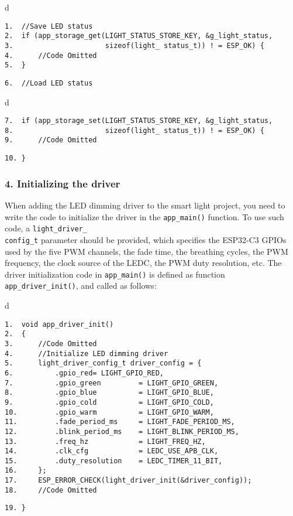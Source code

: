 \documentclass[a4paper,12pt]{book}
\begin{document}
\begin{codebloc}
\begin{tabular}{d}
\vspace{2pt}
\begin{verbatim}
1.  //Save LED status
2.  if (app_storage_get(LIGHT_STATUS_STORE_KEY, &g_light_status,
3.                      sizeof(light_ status_t)) ! = ESP_OK) {
4.      //Code Omitted
5.  }
\end{verbatim}
\verb|6.  //Load LED status|
\end{tabular}
\end{codebloc}

\begin{codebloc}
\begin{tabular}{d}
\vspace{2pt}
\begin{verbatim}
7.  if (app_storage_set(LIGHT_STATUS_STORE_KEY, &g_light_status,
8.                      sizeof(light_ status_t)) ! = ESP_OK) {
9.      //Code Omitted
\end{verbatim}
\verb|10. }|
\end{tabular}
\end{codebloc}

\subsubsection{4. Initializing the driver}
When adding the LED dimming driver to the smart light project, you need to write the code to initialize the driver in the \verb|app_main()| function. To use such code, a \verb|light_driver_|\\ \verb|config_t| parameter should be provided, which specifies the ESP32-C3 GPIOs used by the five PWM channels, the fade time, the breathing cycles, the PWM frequency, the clock source of the LEDC, the PWM duty resolution, etc. The driver initialization code in \verb|app_main()| is defined as function \verb|app_driver_init()|, and called as follows:

\begin{codebloc}
\begin{tabular}{d}
\vspace{2pt}
\begin{verbatim}
1.  void app_driver_init()
2.  {    
3.      //Code Omitted
4.      //Initialize LED dimming driver
5.      light_driver_config_t driver_config = {        
6.          .gpio_red= LIGHT_GPIO_RED,        
7.          .gpio_green         = LIGHT_GPIO_GREEN,        
8.          .gpio_blue          = LIGHT_GPIO_BLUE,        
9.          .gpio_cold          = LIGHT_GPIO_COLD,        
10.         .gpio_warm          = LIGHT_GPIO_WARM,        
11.         .fade_period_ms     = LIGHT_FADE_PERIOD_MS,        
12.         .blink_period_ms    = LIGHT_BLINK_PERIOD_MS,
13.         .freq_hz            = LIGHT_FREQ_HZ,
14.         .clk_cfg            = LEDC_USE_APB_CLK,
15.         .duty_resolution    = LEDC_TIMER_11_BIT,    
16.     };
17.     ESP_ERROR_CHECK(light_driver_init(&driver_config));
18.     //Code Omitted
\end{verbatim}
\verb|19. }|
\end{tabular}
\end{codebloc}
\end{document}
